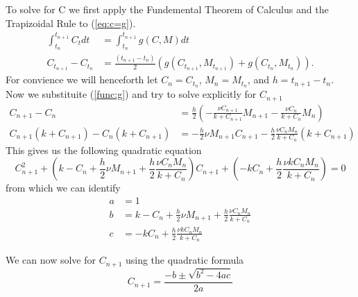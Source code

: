   To solve for C we first apply the Fundemental Theorem of Calculus and the Trapizoidal Rule to (\ref{eq:c=g}).
  \begin{equation}
  \begin{aligned}
    \int^{t_{n+1}}_{t_n} C_t dt &= \int^{t_{n+1}}_{t_n} g(C,M) dt \\
    C_{t_{n+1}} - C_{t_n} &= \frac{(t_{n+1} - t_n)}{2} \left( g(C_{t_{n+1}},M_{t_{n+1}}) + g(C_{t_n}, M_{t_n})  \right).
  \end{aligned}
  \end{equation}
  For convience we will henceforth let $C_n = C_{t_n}$, $M_n = M_{t_n}$, and $h = t_{n+1} - t_n$.
  Now we substituite (\ref{func:g}) and try to solve explicitly for $C_{n+1}$
  \begin{equation} \begin{aligned}
    C_{n+1} - C_n &= \frac{h}{2}  \left( -\frac{\nu C_{n+1}}{k + C_{n+1}} M_{n+1}  -\frac{\nu C_n}{k + C_n} M_n \right) \\
    C_{n+1} (k + C_{n+1}) - C_n (k + C_{n+1}) &= -\frac{h}{2} \nu M_{n+1} C_{n+1} - \frac{h}{2} \frac{\nu C_n M_n}{k + C_n} (k + C_{n+1})
  \end{aligned} \end{equation}
  This gives us the following quadratic equation
  \begin{equation}  
    C_{n+1}^2 + \left( k - C_n + \frac{h}{2} \nu M_{n+1} + \frac{h}{2}\frac{\nu C_n M_n}{k + C_n} \right) C_{n+1} + \left( -k C_n + \frac{h}{2} \frac{\nu k C_n M_n}{k + C_n} \right) = 0
  \end{equation}
  from which we can identify
  \begin{equation} \begin{aligned} \label{para:abc}
    a &= 1\\
    b &= k - C_n + \frac{h}{2} \nu M_{n+1} + \frac{h}{2}\frac{\nu C_n M_n}{k + C_n}\\
    c &= -k C_n + \frac{h}{2}\frac{\nu k C_n M_n}{k + C_n}
  \end{aligned}  \end{equation}
  
  We can now solve for $C_{n+1}$ using the quadratic formula
  \begin{equation} \label{eq:Cquad}
    C_{n+1} = \frac{-b \pm \sqrt{b^2 - 4ac}}{2a}
  \end{equation}
  
